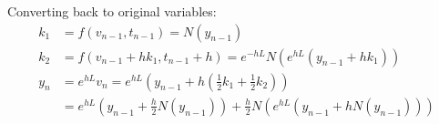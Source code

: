 \documentclass{article}
\theoremstyle{definition}
\begin{document}
Converting back to original variables:
\begin{align*}
k_1 &= f(v_{n-1}, t_{n-1})=N(y_{n-1})\\
k_2 &= f(v_{n-1}+hk_1, t_{n-1}+h) =e^{-hL}N(e^{hL}(y_{n-1}+hk_1))\\
y_n &= e^{hL}v_n  = e^{hL}\left(y_{n-1} + h\left(\frac{1}{2}k_1 +\frac{1}{2}k_2\right)\right)\\
&=  e^{hL} \left(y_{n-1} +\frac{h}{2}N(y_{n-1})\right)+\frac{h}{2}N(e^{hL}(y_{n-1}+hN(y_{n-1})))
\end{align*}
%
%
%
\end{document}
